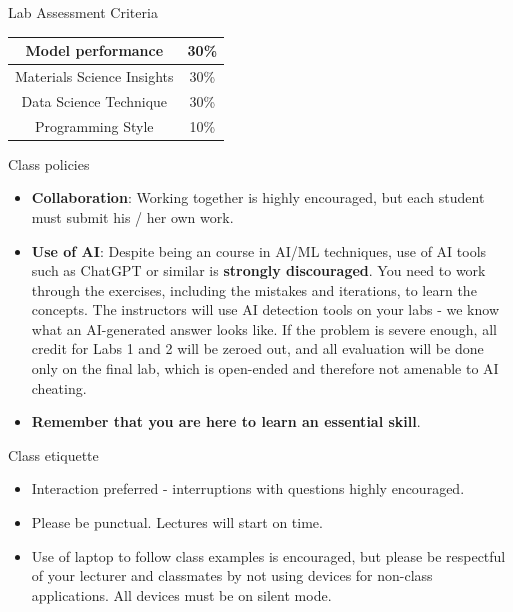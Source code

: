 \documentclass[aspectratio=169]{beamer}
\begin{document}
\begin{frame}{Lab Assessment Criteria}
\begin{table}[]
    \centering
    \begin{tabular}{|c|c|}
    \hline
Model performance & 30\%\\
\hline
Materials Science Insights & 30\%\\
\hline
Data Science Technique & 30\%\\
\hline
Programming Style & 10\%\\
\hline
    \end{tabular}
\end{table}
\end{frame}

\begin{frame}{Class policies}
    \begin{itemize}
        \item \textbf{Collaboration}:  Working together is highly encouraged, but each student must submit his / her own work. 
        \item \textbf{Use of AI}: Despite being an course in AI/ML techniques, use of AI tools such as ChatGPT or similar is \textbf{strongly discouraged}. You need to work through the exercises, including the mistakes and iterations, to learn the concepts. The instructors will use AI detection tools on your labs - we know what an AI-generated answer looks like. If the problem is severe enough, all credit for Labs 1 and 2 will be zeroed out, and all evaluation will be done only on the final lab, which is open-ended and therefore not amenable to AI cheating.
        \item \textbf{Remember that you are here to learn an essential skill}.
    \end{itemize}
\end{frame}


\begin{frame}{Class etiquette}
    \begin{itemize}
        \item Interaction preferred - interruptions with questions highly encouraged.
        \item Please be punctual. Lectures will start on time.
        \item Use of laptop to follow class examples is encouraged, but please be respectful of your lecturer and classmates by not using devices for non-class applications.  All devices must be on silent mode.
    \end{itemize}
\end{frame}
\end{document}
